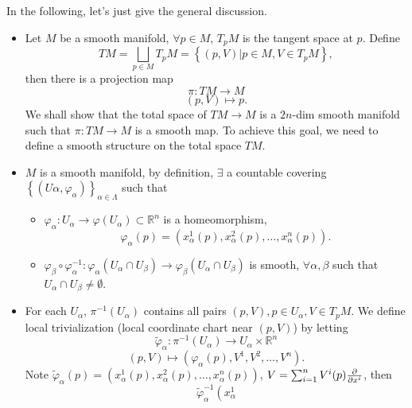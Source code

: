 \begin{enumerate}[(1)]
    In the following, let's just give the general discussion.
    \begin{itemize}
        \item Let \(M\) be a smooth manifold, \(\forall p\in M\), 
        \(T_p M\) is the tangent space at \(p\). Define
        \[
            TM=\bigsqcup_{p\in M}T_p M=\left\{(p,V)| p\in M, V\in 
            T_p M\right\}   
        ,\]
        then there is a projection map 
        \[
            \pi\colon TM\to M
            \]
        \[
            (p,V)\mapsto p.      
            \]
        We shall show that the total space of \(TM\to M\) is a \(2n\)-dim
        smooth manifold such that \(\pi\colon TM \to M\) is a smooth map. 
        To achieve this goal, we need to define a smooth structure on the 
        total space \(TM\).
        \item \(M\) is a smooth manifold, by definition, \(\exists\) a
        countable covering \(\left\{\left(U\alpha,\varphi_\alpha\right)
        \right\}_{\alpha\in \Lambda}\) such that
        \begin{itemize}
            \item \(\varphi_\alpha\colon U_\alpha\to \varphi
            \left(U_\alpha\right)\subset \mathbb{R}^n\) is a 
            homeomorphism,
            \[
                \varphi_\alpha(p)=\left(x^1_\alpha(p),
                x^2_\alpha(p),\ldots,x^n_\alpha(p)\right).
            \]
            \item \(\varphi_\beta\circ \varphi_\alpha^{-1}\colon
            \varphi_\alpha\left(U_\alpha\cap U_\beta\right)
            \to \varphi_\beta\left(U_\alpha\cap U_\beta\right)
            \) is smooth, \(\forall\alpha,\beta\) such that 
            \(U_\alpha\cap U_\beta\neq \emptyset\).
        \end{itemize}
        \item For each \(U_\alpha\), \(\pi^{-1}\left(U_\alpha\right)\)
        contains all pairs \((p,V),p\in U_\alpha,V\in T_p M\). We define
        local trivialization (local coordinate chart near \((p,V)\)) 
        by letting 
        \[
            \widetilde{\varphi}_\alpha\colon 
            \pi^{-1}\left(U_\alpha\right)\to U_\alpha\times 
            \mathbb{R}^n
        \]
        \[
            (p,V)\mapsto \left(\varphi_\alpha(p),V^1,V^2,\ldots,
            V^n\right).    
        \]
        Note \(\widetilde{\varphi}_\alpha(p)=\left(x^1_\alpha(p)
        ,x^2_\alpha(p),\ldots,x^n_\alpha(p)\right)\), 
        \(V=\sum_{i=1}^n V^i(p)\pdv{x^i}\), then
        \[\widetilde{\varphi}_\alpha^{-1}\left(x^1_\alpha
\]
\end{itemize}
\end{enumerate}
